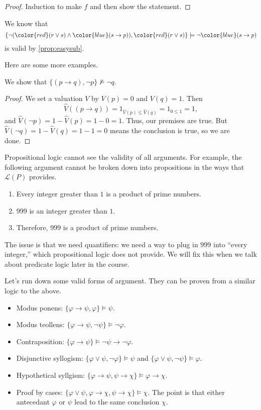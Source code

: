 \begin{proof}
	Induction to make $f$ and then show the statement.
\end{proof}
\begin{example}
	We know that
	\[\{\lnot({\color{red}(r\lor s)}\land{\color{blue}(s\to p)}),{\color{red}(r\lor s)}\}\models\lnot{\color{blue}(s\to p)}\]
	is valid by \autoref{prop:easysub}.
\end{example}
Here are some more examples.
\begin{exe}
	We show that $\{(p\to q),\lnot p\}\nvDash\lnot q$.
\end{exe}
\begin{proof}
	We set a valuation $V$ by $V(p)=0$ and $V(q)=1$. Then
	\[\hat V((p\to q))=1_{\hat V(p)\le\hat V(q)}=1_{0\le1}=1,\]
	and $\hat V(\lnot p)=1-\hat V(p)=1-0=1$. Thus, our premises are true. But $\hat V(\lnot q)=1-\hat V(q)=1-1=0$ means the conclusion is true, so we are done.
\end{proof}
\begin{remark}
	Propositional logic cannot see the validity of all arguments. For example, the following argument cannot be broken down into propositions in the ways that $\mathcal L(P)$ provides.
	\begin{enumerate}
		\item Every integer greater than $1$ is a product of prime numbers.
		\item $999$ is an integer greater than $1$.
		\item Therefore, $999$ is a product of prime numbers.
	\end{enumerate}
	The issue is that we need quantifiers: we need a way to plug in $999$ into ``every integer,'' which propositional logic does not provide. We will fix this when we talk about predicate logic later in the course.
\end{remark}
Let's run down some valid forms of argument. They can be proven from a similar logic to the above.
\begin{itemize}
	\item Modus ponens: $\{\varphi\to\psi,\varphi\}\models\psi$.
	\item Modus teollens: $\{\varphi\to\psi,\lnot\psi\}\models\lnot\varphi$.
	\item Contraposition: $\{\varphi\to\psi\}\models\lnot\psi\to\lnot\varphi$.
	\item Disjunctive syllogism: $\{\varphi\lor\psi,\lnot\varphi\}\models\psi$ and $\{\varphi\lor\psi,\lnot\psi\}\models\varphi$.
	\item Hypothetical syllgism: $\{\varphi\to\psi,\psi\to\chi\}\models\varphi\to\chi$.
	\item Proof by cases: $\{\varphi\lor\psi,\varphi\to\chi,\psi\to\chi\}\models\chi$. The point is that either antecedant $\varphi$ or $\psi$ lead to the same conclusion $\chi$.
\end{itemize}

